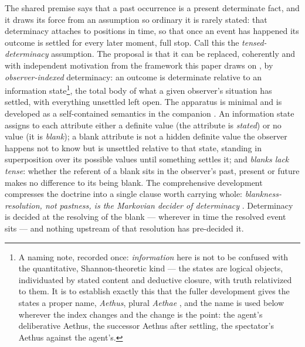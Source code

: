 The shared premise says that a past occurrence is a present determinate fact, and it draws its force from an assumption so ordinary it is rarely stated: that determinacy attaches to positions in time, so that once an event has happened its outcome is settled for every later moment, full stop. Call this the \emph{tensed-determinacy} assumption. The proposal is that it can be replaced, coherently and with independent motivation from the framework this paper draws on \cite{Aethus}, by \emph{observer-indexed} determinacy: an outcome is determinate relative to an information state\footnote{A naming note, recorded once: \emph{information} here is not to be confused with the quantitative, Shannon-theoretic kind --- the states are logical objects, individuated by stated content and deductive closure, with truth relativized to them. It is to establish exactly this that the fuller development gives the states a proper name, \emph{Aethus}, plural \emph{Aethae} \cite{Aethus}, and the name is used below wherever the index changes and the change is the point: the agent's deliberative Aethus, the successor Aethus after settling, the spectator's Aethus against the agent's.}, the total body of what a given observer's situation has settled, with everything unsettled left open. The apparatus is minimal and is developed as a self-contained semantics in the companion \cite{AethusSemantics}. An information state assigns to each attribute either a definite value (the attribute is \emph{stated}) or no value (it is \emph{blank}); a blank attribute is not a hidden definite value the observer happens not to know but is unsettled relative to that state, standing in superposition over its possible values until something settles it; and \emph{blanks lack tense}: whether the referent of a blank sits in the observer's past, present or future makes no difference to its being blank.
The comprehensive development compresses the doctrine into a single clause worth carrying whole: \emph{blankness-resolution, not pastness, is the Markovian decider of determinacy} \cite{Aethus}. Determinacy is decided at the resolving of the blank --- wherever in time the resolved event sits --- and nothing upstream of that resolution has pre-decided it.

